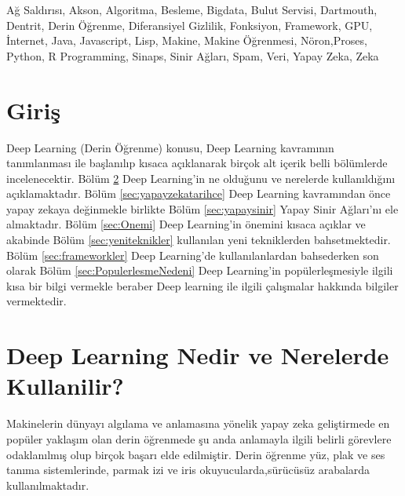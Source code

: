 \documentclass{IEEEtran}
\begin{document}

    \begin{IEEEkeywords}
        	Ağ Saldırısı, Akson, Algoritma, Besleme, Bigdata, Bulut Servisi, Dartmouth, Dentrit, Derin Öğrenme, Diferansiyel Gizlilik, Fonksiyon, Framework, GPU, İnternet, Java, Javascript, Lisp, Makine, Makine Öğrenmesi, Nöron,Proses, Python, R Programming, Sinaps, Sinir Ağları, Spam, Veri, Yapay Zeka, Zeka
    \end{IEEEkeywords}
    

    \section{Giriş}
        \label{sec:giris}
            Deep Learning (Derin Öğrenme) konusu, Deep Learning kavramının tanımlanması ile başlanılıp kısaca açıklanarak birçok alt içerik belli bölümlerde incelenecektir. Bölüm \ref{sec:tanim} Deep Learning'in ne olduğunu ve nerelerde kullanıldığını açıklamaktadır. Bölüm \ref{sec:yapayzekatarihce} Deep Learning kavramından önce yapay zekaya değinmekle birlikte Bölüm \ref{sec:yapaysinir} Yapay Sinir Ağları'nı ele almaktadır. Bölüm \ref{sec:Onemi} Deep Learning'in önemini kısaca açıklar ve akabinde Bölüm \ref{sec:yeniteknikler} kullanılan yeni tekniklerden bahsetmektedir. Bölüm \ref{sec:frameworkler} Deep Learning'de kullanılanlardan bahsederken son olarak Bölüm \ref{sec:PopulerlesmeNedeni} Deep Learning'in popülerleşmesiyle ilgili kısa bir bilgi vermekle beraber Deep learning ile ilgili çalışmalar hakkında bilgiler vermektedir.\vspace{10pt}

    
    \section{Deep Learning Nedir ve Nerelerde Kullanilir? }
        \label{sec:tanim}
            Makinelerin dünyayı algılama ve anlamasına yönelik yapay zeka geliştirmede en popüler yaklaşım olan derin öğrenmede şu anda anlamayla ilgili belirli görevlere odaklanılmış olup birçok başarı elde edilmiştir. Derin öğrenme yüz, plak ve ses tanıma sistemlerinde, parmak izi ve iris okuyucularda,sürücüsüz arabalarda kullanılmaktadır.\vspace{10pt}
            
\end{document}
